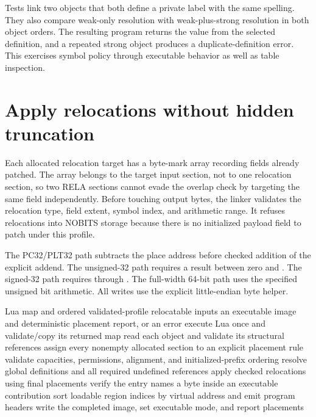 Tests link two objects that both define a private label with the same spelling.
They also compare weak-only resolution with weak-plus-strong resolution in both object orders.
The resulting program returns the value from the selected definition, and a repeated strong object produces a duplicate-definition error.
This exercises symbol policy through executable behavior as well as table inspection.

\section{Apply relocations without hidden truncation}
\label{sec:ch60-relocations}

Each allocated relocation target has a byte-mark array recording fields already patched.
The array belongs to the target input section, not to one relocation section, so two RELA sections cannot evade the overlap check by targeting the same field independently.
Before touching output bytes, the linker validates the relocation type, field extent, symbol index, and arithmetic range.
It refuses relocations into NOBITS storage because there is no initialized payload field to patch under this profile.

The PC32/PLT32 path subtracts the place address before checked addition of the explicit addend.
The unsigned-32 path requires a result between zero and .
The signed-32 path requires  through .
The full-width 64-bit path uses the specified unsigned bit arithmetic.
All writes use the explicit little-endian byte helper.

\begin{algorithm}[htbp]
\caption{Link the complete static image in dependency order.}
\label{alg:ch60-pipeline}
\begin{pseudocode}
\Require Lua map and ordered validated-profile relocatable inputs
\Ensure an executable image and deterministic placement report, or an error
\State execute Lua once and validate/copy its returned map
\State read each object and validate its structural references
\State assign every nonempty allocated section to an explicit placement rule
\State validate capacities, permissions, alignment, and initialized-prefix ordering
\State resolve global definitions and all required undefined references
\State apply checked relocations using final placements
\State verify the entry names a byte inside an executable contribution
\State sort loadable region indices by virtual address and emit program headers
\State write the completed image, set executable mode, and report placements
\end{pseudocode}
\end{algorithm}

